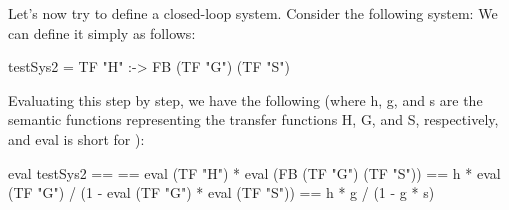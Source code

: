 Let's now try to define a closed-loop system. Consider the following system:
We can define it simply as follows:
\begin{code}
testSys2 = TF "H" :-> FB (TF "G") (TF "S")
\end{code}
Evaluating this step by step, we have the following (where h, g, and s are the semantic functions representing the transfer functions H, G, and S, respectively, and eval is short for ):
\begin{codeeq}
eval testSys2 ==
  == eval (TF "H") * eval (FB (TF "G") (TF "S"))
  == h * eval (TF "G") / (1 - eval (TF "G") * eval (TF "S"))
  == h * g / (1 - g * s)
\end{codeeq}




